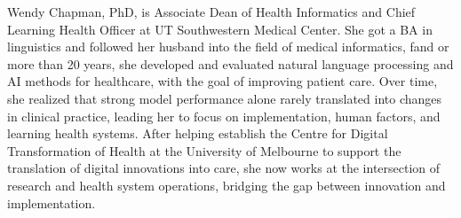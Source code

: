 Wendy Chapman, PhD, is Associate Dean of Health Informatics and Chief Learning Health Officer at UT Southwestern Medical Center. She got a BA in linguistics and followed her husband into the field of medical informatics, fand or more than 20 years, she developed and evaluated natural language processing and AI methods for healthcare, with the goal of improving patient care. Over time, she realized that strong model performance alone rarely translated into changes in clinical practice, leading her to focus on implementation, human factors, and learning health systems. After helping establish the Centre for Digital Transformation of Health at the University of Melbourne to support the translation of digital innovations into care, she now works at the intersection of research and health system operations, bridging the gap between innovation and implementation.